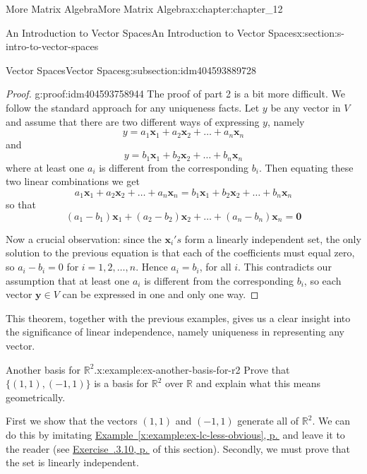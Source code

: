 \documentclass[twoside,10pt,]{book}
\newcommand{\xreffont}{\relax}
\numberwithin{equation}{section}
\renewcommand{\vec}[1]{\mathbf{#1}}
\begin{document}
\begin{chapterptx}{More Matrix Algebra}{}{More Matrix Algebra}{}{}{x:chapter:chapter_12}
\begin{sectionptx}{An Introduction to Vector Spaces}{}{An Introduction to Vector Spaces}{}{}{x:section:s-intro-to-vector-spaces}
\begin{subsectionptx}{Vector Spaces}{}{Vector Spaces}{}{}{g:subsection:idm404593889728}
\begin{proof}{}{g:proof:idm404593758944}
The proof of part 2 is a bit more difficult. We follow the standard approach for any uniqueness facts. Let \(y\) be any vector in \(V\) and assume that there are two different ways of expressing \(y\), namely%
\begin{equation*}
y = a_1 \vec{x}_1+a_2 \vec{x}_2+\ldots +a_n \vec{x}_n
\end{equation*}
and%
\begin{equation*}
y = b_1 \vec{x}_1+b_2 \vec{x}_2+\ldots +b_n \vec{x}_n
\end{equation*}
where at least one \(a_i\) is different from the corresponding \(b_i\).   Then equating these two linear combinations we get%
\begin{equation*}
a_1 \vec{x}_1+a_2 \vec{x}_2+\ldots +a_n \vec{x}_n=b_1 \vec{x}_1+b_2 \vec{x}_2+\ldots +b_n \vec{x}_n
\end{equation*}
so that%
\begin{equation*}
\left(a_1-b_1\right) \vec{x}_1+\left(a_2-b_2\right) \vec{x}_2+\ldots +\left(a_n-b_n\right) \vec{x}_n=\vec{0}
\end{equation*}
%
\par
Now a crucial observation: since the \(\vec{x}_i's\) form a linearly independent set, the only solution to the previous equation is that each of the coefficients must equal zero, so \(a_i-b_i=0\) for \(i = 1, 2, \ldots  ,n\).   Hence \(a_i=b_i\), for all \(i\). This contradicts our assumption that at least one \(a_i\) is different from the corresponding \(b_i\), so each vector \(\vec{y} \in  V\) can be expressed in one and only one way.%
\end{proof}
This theorem, together with the previous examples, gives us a clear insight into the significance of linear independence, namely uniqueness in representing any vector.%
\begin{example}{Another basis for \(\mathbb{R}^2\).}{x:example:ex-another-basis-for-r2}%
Prove that \(\{(1, 1), (-1, 1)\}\) is a basis for \(\mathbb{R}^2\) over \(\mathbb{R}\) and explain what this means geometrically.%
\par
First we show that the vectors \((1, 1)\) and \((-1, 1)\) generate all of \(\mathbb{R}^2\). We can do this by imitating \hyperref[x:example:ex-lc-less-obvious]{Example~{\xreffont\ref{x:example:ex-lc-less-obvious}}, p.\,\pageref{x:example:ex-lc-less-obvious}} and leave it to the reader (see \hyperlink{x:exercise:exercise-12-3-10}{Exercise~{\xreffont 12.3.3.10}, p.\,\pageref{x:exercise:exercise-12-3-10}} of this section). Secondly, we must prove that the set is linearly independent.%

\end{example}
\end{subsectionptx}
\end{sectionptx}
\end{chapterptx}
\end{document}

